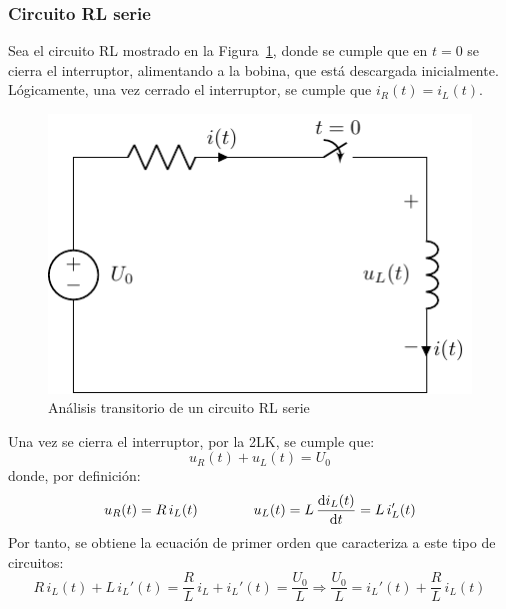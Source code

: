 \subsubsection{Circuito RL serie}
	
Sea el circuito RL mostrado en la Figura~\ref{fig:transitorio_RL},
donde se cumple que en $t = 0$ se cierra el interruptor, alimentando a
la bobina, que está descargada inicialmente. Lógicamente, una vez
cerrado el interruptor, se cumple que $i_R(t)=i_L(t)$.
\begin{figure}[H]
  \centering \includegraphics{../figs/transitorio_circuitoRL.pdf}
  \caption{Análisis transitorio de un circuito RL serie}
  \label{fig:transitorio_RL}
\end{figure}
	
Una vez se cierra el interruptor, por la 2LK, se cumple que:
\begin{equation*}
  u_R(t) + u_L(t) = U_0
\end{equation*}
donde, por definición:
\begin{equation*}
  u_R(t)=R\,i_L(t)\qquad\qquad u_L(t)=L\,\diff{i_L(t)}{t}=L\,i_L'(t)
\end{equation*}
Por tanto, se obtiene la ecuación de primer orden que caracteriza a
este tipo de circuitos:
\begin{equation}\label{eq:1orden_L}
  R\,i_L(t)+L\, i_L'(t)=\dfrac{R}{L}\,i_L+i_L'(t)=\dfrac{U_0}{L}\Rightarrow \boxed{\dfrac{U_0}{L}=i_L'(t)+\dfrac{R}{L}\,i_L(t)}
\end{equation}
	

